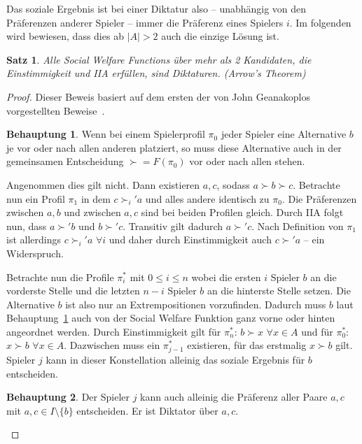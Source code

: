 \documentclass[a4paper,11pt]{article}
\theoremstyle{definition}
\theoremstyle{plain}
\newtheorem{theorem}[definition]{Satz}
\theoremstyle{definition}
\newtheorem{claim}{Behauptung}
\begin{document}
Das soziale Ergebnis ist bei einer Diktatur also -- unabhängig von den Präferenzen anderer Spieler -- immer die Präferenz eines Spielers $i$.
Im folgenden wird bewiesen, dass dies ab $|A| > 2$ auch die einzige Lösung ist.

\begin{theorem}
	Alle Social Welfare Functions über mehr als 2 Kandidaten, die Einstimmigkeit und IIA erfüllen, sind Diktaturen. (Arrow's Theorem)
\end{theorem}

\begin{proof}
	Dieser Beweis basiert auf dem ersten der von John Geanakoplos vorgestellten Beweise~\cite{gea05}.
	
	\begin{claim} 
		\label{claim:extrementsch}
		Wenn bei einem Spielerprofil $\pi_0$ jeder Spieler eine Alternative $b$ je vor oder nach allen anderen platziert, so muss diese Alternative auch in der gemeinsamen Entscheidung $\succ = F(\pi_0)$ vor oder nach allen stehen.
	\end{claim}

	Angenommen dies gilt nicht. Dann existieren $a, c$, sodass $a \succ b \succ c$. Betrachte nun ein Profil $\pi_1$ in dem $c \succ_i' a$ und alles andere identisch zu $\pi_0$. Die Präferenzen zwischen $a, b$ und zwischen $a, c$ sind bei beiden Profilen gleich. Durch IIA folgt nun, dass $a \succ' b$ und $b \succ' c$. Transitiv gilt dadurch $a \succ' c$. Nach Definition von $\pi_1$ ist allerdings $c \succ_i' a$ $\forall i$ und daher durch Einstimmigkeit auch $c \succ' a$ -- ein Widerspruch.
	
	Betrachte nun die Profile $\pi_i^*$ mit $0 \leq i \leq n$ wobei die ersten $i$ Spieler $b$ an die vorderste Stelle und die letzten $n-i$ Spieler $b$ an die hinterste Stelle setzen. Die Alternative $b$ ist also nur an Extrempositionen vorzufinden. Dadurch muss $b$ laut Behauptung~\ref{claim:extrementsch} auch von der Social Welfare Funktion ganz vorne oder hinten angeordnet werden. Durch Einstimmigkeit gilt für $\pi_n^*$: $b \succ x$ $\forall x \in A$ und für $\pi_0^*$:  $x \succ b$ $\forall x \in A$. Dazwischen muss ein $\pi_{j-1}^*$ existieren, für das erstmalig $x \succ b$ gilt. Spieler $j$ kann in dieser Konstellation alleinig das soziale Ergebnis für $b$ entscheiden.
	
	\begin{claim}
		\label{claim:jdiktac}
		Der Spieler $j$ kann auch alleinig die Präferenz aller Paare $a,c$ mit $a, c \in I \setminus \{b\}$ entscheiden. Er ist Diktator über $a,c$.
	\end{claim}


\end{proof}
\end{document}
